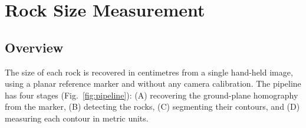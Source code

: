%
%
%
%

\section{Rock Size Measurement}
\label{sec:measurement}

\subsection{Overview}
The size of each rock is recovered in centimetres from a single hand-held image,
using a planar reference marker and without any camera calibration. The pipeline
has four stages (Fig.~\ref{fig:pipeline}): (A) recovering the ground-plane
homography from the marker, (B) detecting the rocks, (C) segmenting their
contours, and (D) measuring each contour in metric units.

